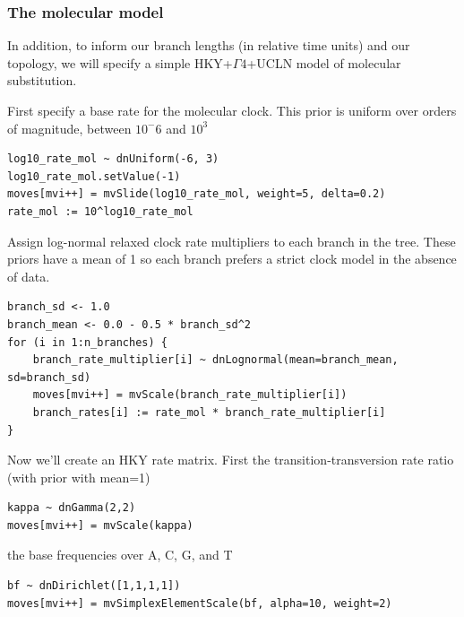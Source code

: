 \subsubsection{The molecular model}

In addition, to inform our branch lengths (in relative time units) and our topology, we will specify a simple HKY+$\Gamma4$+UCLN model of molecular substitution.


First specify a base rate for the molecular clock. This prior is uniform over orders of magnitude, between $10^-6$ and $10^3$
\begin{snugshade}
\begin{lstlisting}
log10_rate_mol ~ dnUniform(-6, 3)
log10_rate_mol.setValue(-1)
moves[mvi++] = mvSlide(log10_rate_mol, weight=5, delta=0.2)
rate_mol := 10^log10_rate_mol
\end{lstlisting}
\end{snugshade}

Assign log-normal relaxed clock rate multipliers to each branch in the tree. These priors have a mean of 1 so each branch prefers a strict clock model in the absence of data.
\begin{snugshade}
\begin{lstlisting}
branch_sd <- 1.0
branch_mean <- 0.0 - 0.5 * branch_sd^2
for (i in 1:n_branches) {
    branch_rate_multiplier[i] ~ dnLognormal(mean=branch_mean, sd=branch_sd)
    moves[mvi++] = mvScale(branch_rate_multiplier[i])
    branch_rates[i] := rate_mol * branch_rate_multiplier[i]
}
\end{lstlisting}
\end{snugshade}

Now we'll create an HKY rate matrix. First the transition-transversion rate ratio (with prior with mean=1)

\begin{snugshade}
\begin{lstlisting}
kappa ~ dnGamma(2,2)
moves[mvi++] = mvScale(kappa)
\end{lstlisting}
\end{snugshade}

the base frequencies over A, C, G, and T

\begin{snugshade}
\begin{lstlisting}
bf ~ dnDirichlet([1,1,1,1])
moves[mvi++] = mvSimplexElementScale(bf, alpha=10, weight=2)
\end{lstlisting}
\end{snugshade}

